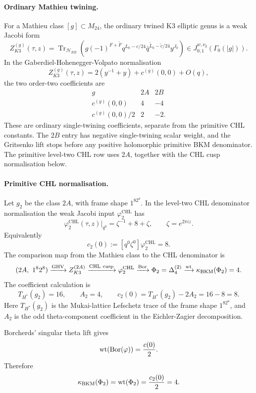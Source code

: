 \paragraph{Ordinary Mathieu twining.}
For a Mathieu class \([g]\subset M_{24}\), the ordinary twined K3
elliptic genus is a weak Jacobi form
\[
 Z^{(g)}_{K3}(\tau,z)
  =\operatorname{Tr}_{\mathcal H_{RR}}
  \left(g(-1)^{F+\widetilde F}q^{L_0-c/24}
  \bar q^{\widetilde L_0-\widetilde c/24}y^{J_0}\right)
  \in J^{w,\nu_g}_{0,1}(\Gamma_0(|g|)).
\]
In the Gaberdiel-Hohenegger-Volpato normalisation
\[
 Z^{(g)}_{K3}(\tau,z)=2(y^{-1}+y)+c^{(g)}(0,0)+O(q),
\]
the two order-two coefficients are
\[
\begin{array}{c|cc}
g & 2A & 2B\\
\hline
c^{(g)}(0,0) & 4 & -4\\
c^{(g)}(0,0)/2 & 2 & -2 .
\end{array}
\]
These are ordinary single-twining coefficients, separate from the
primitive CHL constants.  The \(2B\) entry has negative single-twining
scalar weight, and the Gritsenko lift stops before any positive
holomorphic primitive BKM denominator.  The primitive level-two CHL row
uses \(2A\), together with the CHL cusp normalisation below.

\paragraph{Primitive CHL normalisation.}
Let \(g_2\) be the class \(2A\), with frame shape \(1^82^8\).  In the
level-two CHL denominator normalisation the weak Jacobi input
\(\varphi^{\mathrm{CHL}}_2\) has
\[
 \varphi^{\mathrm{CHL}}_2(\tau,z)\big|_{q^0}
  = \zeta^{-1}+8+\zeta,\qquad \zeta=e^{2\pi iz}.
\]
Equivalently
\[
 c_2(0):=[q^0\zeta^0]\varphi^{\mathrm{CHL}}_2=8.
\]
The comparison map from the Mathieu class to the CHL denominator is
\[
(2A,\ 1^82^8)
 \xrightarrow{\mathrm{GHV}}
 Z^{(2A)}_{K3}
 \xrightarrow{\mathrm{CHL\ cusp}}
 \varphi^{\mathrm{CHL}}_2
 \xrightarrow{\operatorname{Bor}}
 \Phi_2=\Delta^{(2)}_4
 \xrightarrow{\operatorname{wt}}
 \kappa_{\mathrm{BKM}}(\Phi_2)=4 .
\]
The coefficient calculation is
\[
 T_{H^\ast}(g_2)=16,\qquad A_2=4,\qquad
 c_2(0)=T_{H^\ast}(g_2)-2A_2=16-8=8.
\]
Here \(T_{H^\ast}(g_2)\) is the Mukai-lattice Lefschetz trace of the
frame shape \(1^82^8\), and \(A_2\) is the odd theta-component
coefficient in the Eichler-Zagier decomposition.

Borcherds' singular theta lift gives
\[
 \operatorname{wt}(\operatorname{Bor}(\varphi))=\frac{c(0)}{2}.
\]
Therefore
\[
 \kappa_{\mathrm{BKM}}(\Phi_2)=\operatorname{wt}(\Phi_2)=\frac{c_2(0)}2=4 .
\]

